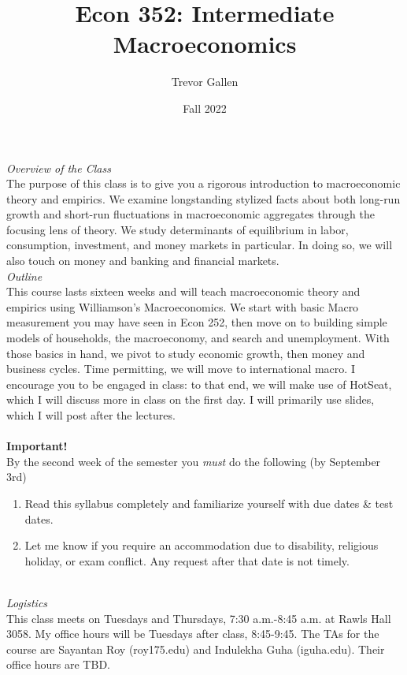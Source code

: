 \documentclass[a4paper]{article}
\title{Econ 352: Intermediate Macroeconomics}
\author{Trevor Gallen}
\date{Fall 2022}
\begin{document}


\maketitle
\emph{Overview of the Class}\\
The purpose of this class is to give you a rigorous introduction to macroeconomic theory and empirics.  We examine longstanding stylized facts about both long-run growth and short-run fluctuations in macroeconomic aggregates through the focusing lens of theory.  We study determinants of equilibrium in labor, consumption, investment, and money markets in particular.  In doing so, we will also touch on money and banking and financial markets.\\


\emph{Outline}\\
This course lasts sixteen weeks and will teach macroeconomic theory and empirics using Williamson's Macroeconomics. We start with basic Macro measurement you may have seen in Econ 252, then move on to building simple models of households, the macroeconomy, and search and unemployment.  With those basics in hand, we pivot to study economic growth, then money and business cycles.  Time permitting, we will move to international macro.  I encourage you to be engaged in class: to that end, we will make use of HotSeat, which I will discuss more in class on the first day.  I will primarily use slides, which I will post after the lectures.
\\
\ \\
\textbf{Important!}\\
By the second week of the semester you \emph{must} do the following (by September 3rd)
\begin{enumerate}
\item Read this syllabus completely and familiarize yourself with due dates \& test dates.
\item Let me know if you require an accommodation due to disability, religious holiday, or exam conflict.  Any request after that date is not timely.
\end{enumerate}
\ \\
\emph{Logistics}\\
This class meets on Tuesdays and Thursdays, 7:30 a.m.-8:45 a.m. at Rawls Hall 3058.  My office hours will be Tuesdays after class, 8:45-9:45.  The TAs for the course are Sayantan Roy (roy175\@purdue.edu) and Indulekha Guha (iguha\@purdue.edu).  Their office hours are TBD.\ \\
\end{document}

